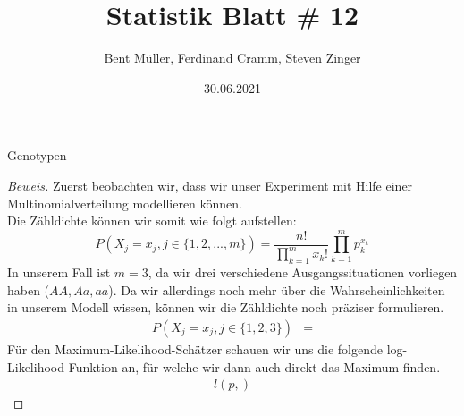 \documentclass[a4paper]{article}
\newenvironment{Aufgabe}[2][Aufgabe]{\begin{trivlist}
\item[\hskip \labelsep {\bfseries #1}\hskip \labelsep {\bfseries #2.}]}{\end{trivlist}}
\begin{document}
\title{ \textbf{Statistik Blatt \# 12} }
\author{Bent Müller, Ferdinand Cramm, Steven Zinger}
\date{30.06.2021}
\maketitle
	\begin{Aufgabe}{2}
		Genotypen
	\end{Aufgabe}

	\begin{proof}[Beweis]
		Zuerst beobachten wir, dass wir unser Experiment mit Hilfe einer
		Multinomialverteilung modellieren können.
		\\

		Die Zähldichte können wir somit wie folgt aufstellen:
		\[
			P(X_j = x_{j} ,j \in \{
				1, 2, ..., m
				\}) = \frac{ n! }{ 
				\prod_{k = 1}^{m} x_k!
			}
			\prod_{k = 1}^{m} p_k ^{x_k} 
		\]
		In unserem Fall ist $m=3$, da wir drei verschiedene
		Ausgangssituationen vorliegen haben ($AA, Aa, aa$).
		Da wir allerdings noch mehr über die Wahrscheinlichkeiten in unserem
		Modell wissen, können wir die Zähldichte noch präziser formulieren.
		\begin{align*}
			P(X_j = x_{j}, j \in \{
				1, 2, 3
			\} ) &= 
		\end{align*}
		Für den Maximum-Likelihood-Schätzer schauen wir uns die folgende
		log-Likelihood Funktion an, für welche wir dann auch direkt das
		Maximum finden.
		\begin{align*}
			l (p, )
		\end{align*}
	\end{proof}
\end{document}
